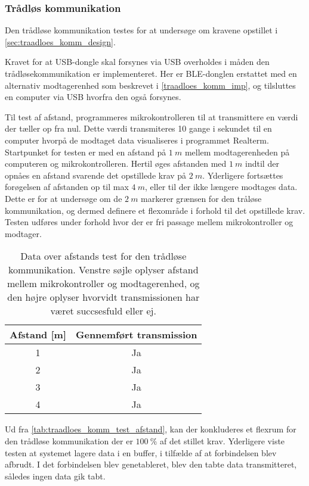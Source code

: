 \subsubsection{Trådløs kommunikation}
Den trådløse kommunikation testes for at undersøge om kravene opstillet i \autoref{sec:traadloes_komm_design}. 

\noindent
Kravet for at USB-dongle skal forsynes via USB overholdes i måden den trådløsekommunikation er implementeret. Her er BLE-donglen erstattet med en alternativ modtagerenhed som beskrevet i \autoref{traadloes_komm_imp}, og tilsluttes en computer via USB hvorfra den også forsynes. 


\noindent
Til test af afstand, programmeres mikrokontrolleren til at transmittere en værdi der tæller op fra nul. Dette værdi transmiteres 10 gange i sekundet til en computer hvorpå de modtaget data visualiseres i programmet Realterm.
Startpunket for testen er med en afstand på $1~m$ mellem modtagerenheden på computeren og mikrokontrolleren. 
Hertil øges afstanden med $1~m$ indtil der opnåes en afstand svarende det opstillede krav på $2~m$. Yderligere fortsættes forøgelsen af afstanden op til max $4~m$, eller til der ikke længere modtages data. Dette er for at undersøge om de $2~m$ markerer grænsen for den tråløse kommunikation, og dermed definere et flexområde i forhold til det opstillede krav. Testen udføres under forhold hvor der er fri passage mellem mikrokontroller og modtager.  

\begin{table}[H]
\centering
\begin{tabular}{|c|c|}
\hline 
Afstand [m] & Gennemført transmission \\ 
\hline 
1 & Ja \\ 
\hline 
2 & Ja \\ 
\hline 
3 & Ja \\ 
\hline 
4 & Ja \\ 
\hline 
\end{tabular} 
\caption{Data over afstands test for den trådløse kommunikation. Venstre søjle oplyser afstand mellem mikrokontroller og modtagerenhed, og den højre oplyser hvorvidt transmissionen har været succsesfuld eller ej.}
\label{tab:traadloes_komm_test_afstand}
\end{table}

Ud fra \autoref{tab:traadloes_komm_test_afstand}, kan der konkluderes et flexrum for den trådløse kommunikation der er $100~\%$ af det stillet krav. Yderligere viste testen at systemet lagere data i en buffer, i tilfælde af at forbindelsen blev afbrudt. I det forbindelsen blev genetableret, blev den tabte data transmitteret, således ingen data gik tabt. 

 